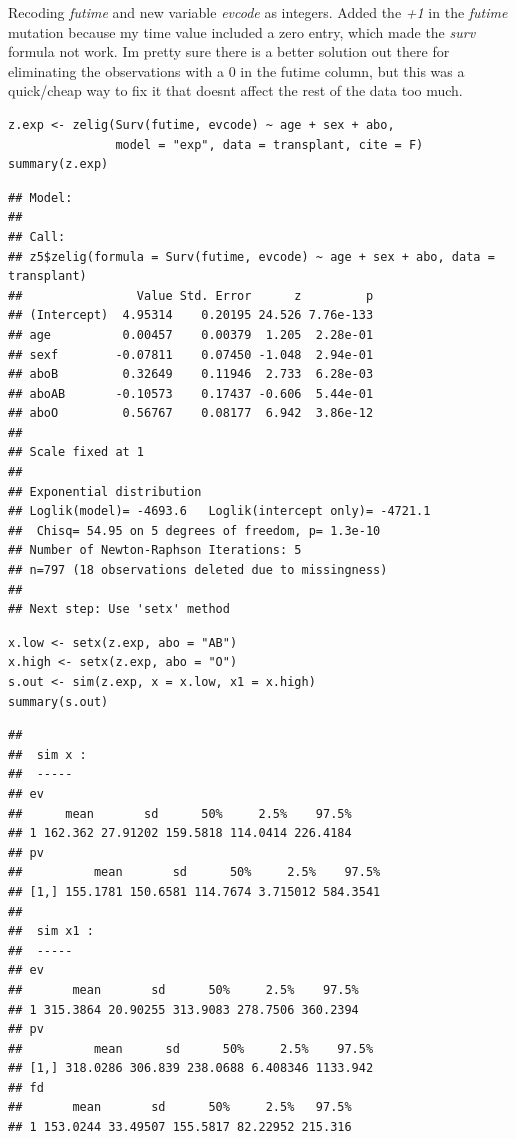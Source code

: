 \documentclass[
]{article}
\begin{document}
Recoding \emph{futime} and new variable \emph{evcode} as integers. Added
the \emph{+1} in the \emph{futime} mutation because my time value
included a zero entry, which made the \emph{surv} formula not work.
I\textquotesingle m pretty sure there is a better solution out there for
eliminating the observations with a 0 in the futime column, but this was
a quick/cheap way to fix it that doesn\textquotesingle t affect the rest
of the data too much.

\begin{verbatim}
z.exp <- zelig(Surv(futime, evcode) ~ age + sex + abo,
               model = "exp", data = transplant, cite = F)
summary(z.exp)
\end{verbatim}

\begin{verbatim}
## Model: 
## 
## Call:
## z5$zelig(formula = Surv(futime, evcode) ~ age + sex + abo, data = transplant)
##                Value Std. Error      z         p
## (Intercept)  4.95314    0.20195 24.526 7.76e-133
## age          0.00457    0.00379  1.205  2.28e-01
## sexf        -0.07811    0.07450 -1.048  2.94e-01
## aboB         0.32649    0.11946  2.733  6.28e-03
## aboAB       -0.10573    0.17437 -0.606  5.44e-01
## aboO         0.56767    0.08177  6.942  3.86e-12
## 
## Scale fixed at 1 
## 
## Exponential distribution
## Loglik(model)= -4693.6   Loglik(intercept only)= -4721.1
##  Chisq= 54.95 on 5 degrees of freedom, p= 1.3e-10 
## Number of Newton-Raphson Iterations: 5 
## n=797 (18 observations deleted due to missingness)
## 
## Next step: Use 'setx' method
\end{verbatim}

\begin{verbatim}
x.low <- setx(z.exp, abo = "AB")
x.high <- setx(z.exp, abo = "O")
s.out <- sim(z.exp, x = x.low, x1 = x.high)
summary(s.out)
\end{verbatim}

\begin{verbatim}
## 
##  sim x :
##  -----
## ev
##      mean       sd      50%     2.5%    97.5%
## 1 162.362 27.91202 159.5818 114.0414 226.4184
## pv
##          mean       sd      50%     2.5%    97.5%
## [1,] 155.1781 150.6581 114.7674 3.715012 584.3541
## 
##  sim x1 :
##  -----
## ev
##       mean       sd      50%     2.5%    97.5%
## 1 315.3864 20.90255 313.9083 278.7506 360.2394
## pv
##          mean      sd      50%     2.5%    97.5%
## [1,] 318.0286 306.839 238.0688 6.408346 1133.942
## fd
##       mean       sd      50%     2.5%   97.5%
## 1 153.0244 33.49507 155.5817 82.22952 215.316
\end{verbatim}
\end{document}
